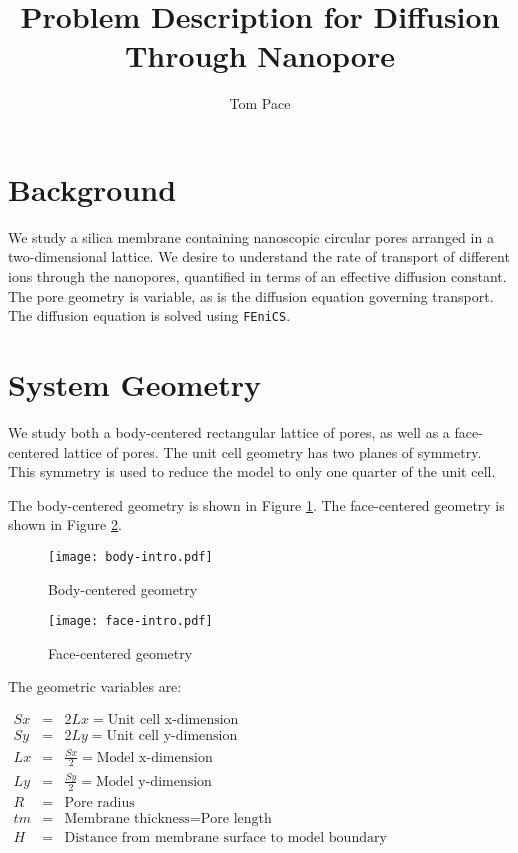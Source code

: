 \documentclass{article}
\begin{document}
\title{Problem Description for Diffusion Through Nanopore}
\author{Tom Pace}
\maketitle


\section{Background}\label{sec:background}

We study a silica membrane containing nanoscopic circular pores arranged in a two-dimensional lattice.
We desire to understand the rate of transport of different ions through the nanopores,
quantified in terms of an effective diffusion constant.
The pore geometry is variable, as is the diffusion equation governing transport.
The diffusion equation is solved using \texttt{FEniCS}.

\section{System Geometry}\label{sec:geometry}

We study both a body-centered rectangular lattice of pores,
as well as a face-centered lattice of pores.
The unit cell geometry has two planes of symmetry.
This symmetry is used to reduce the model to only one quarter of the unit cell.

The body-centered geometry is shown in Figure \ref{fig:body-intro}.
The face-centered geometry is shown in Figure \ref{fig:face-intro}.

\begin{figure}[H]
\centering
\texttt{[image: body-intro.pdf]}
\caption{Body-centered geometry}
\label{fig:body-intro}
\end{figure}

\begin{figure}[H]
\centering
\texttt{[image: face-intro.pdf]}
\caption{Face-centered geometry}
\label{fig:face-intro}
\end{figure}

The geometric variables are:

$\begin{array}{rcl}
Sx & = & 2 Lx =\text{Unit cell x-dimension} \\
Sy & = & 2 Ly =\text{Unit cell y-dimension} \\
Lx & = & \frac{Sx}{2} =\text{Model x-dimension} \\
Ly & = & \frac{Sy}{2} =\text{Model y-dimension} \\
R & = & \text{Pore radius} \\
tm & = & \text{Membrane thickness} = \text{Pore length} \\
H & = & \text{Distance from membrane surface to model boundary}
\end{array}$
\end{document}

